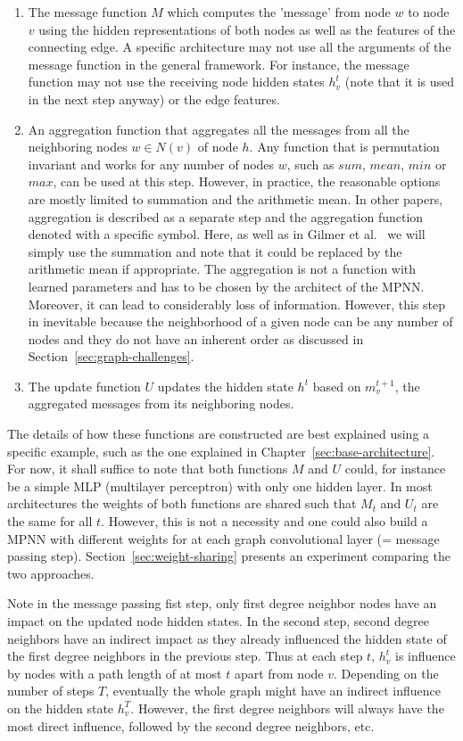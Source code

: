 \begin{enumerate}
	\item The message function $M$ which computes the 'message' from node $w$ to node $v$ using the hidden representations of both nodes as well as the features of the connecting edge. A specific architecture may not use all the arguments of the message function in the general framework. For instance, the message function may not use the receiving node hidden states $h_v^t$ (note that it is used in the next step anyway) or the edge features.
	\item An aggregation function that aggregates all the messages from all the neighboring nodes $w \in N(v)$ of node $h$. Any function that is permutation invariant and works for any number of nodes $w$, such as $sum$, $mean$, $min$ or $max$, can be used at this step. However, in practice, the reasonable options are mostly limited to summation and the arithmetic mean.	
	In other papers, aggregation is described as a separate step and the aggregation function denoted with a specific symbol. Here, as well as in Gilmer et al.~\cite{Gilmer2017} we will simply use the summation and note that it could be replaced by the arithmetic mean if appropriate.
	The aggregation is not a function with learned parameters and has to be chosen by the architect of the MPNN. Moreover, it can lead to considerably loss of information. However, this step in inevitable because the neighborhood of a given node can be any number of nodes and they do not have an inherent order as discussed in Section~\ref{sec:graph-challenges}.
	\item The update function $U$ updates the hidden state $h^t$ based on  $m_v^{t+1}$, the aggregated messages from its neighboring nodes.
\end{enumerate}

The details of how these functions are constructed are best explained using a specific example, such as the one explained in Chapter~\ref{sec:base-architecture}.
For now, it shall suffice to note that both functions $M$ and $U$ could, for instance be a simple MLP (multilayer perceptron) with only one hidden layer. In most architectures the weights of both functions are shared such that $M_t$ and $U_t$ are the same for all $t$. However, this is not a necessity and one could also build a MPNN with different weights for at each graph convolutional layer (= message passing step). Section~\ref{sec:weight-sharing} presents an experiment comparing the two approaches.

Note in the message passing fist step, only first degree neighbor nodes have an impact on the updated node hidden states. In the second step, second degree neighbors have an indirect impact as they already influenced the hidden state of the first degree neighbors in the previous step. Thus at each step $t$, $h_v^t$ is influence by nodes with a path length of at most $t$ apart from node $v$. Depending on the number of steps $T$, eventually the whole graph might have an indirect influence on the hidden state $h_v^T$. However, the first degree neighbors will always have the most direct influence, followed by the second degree neighbors, etc.

